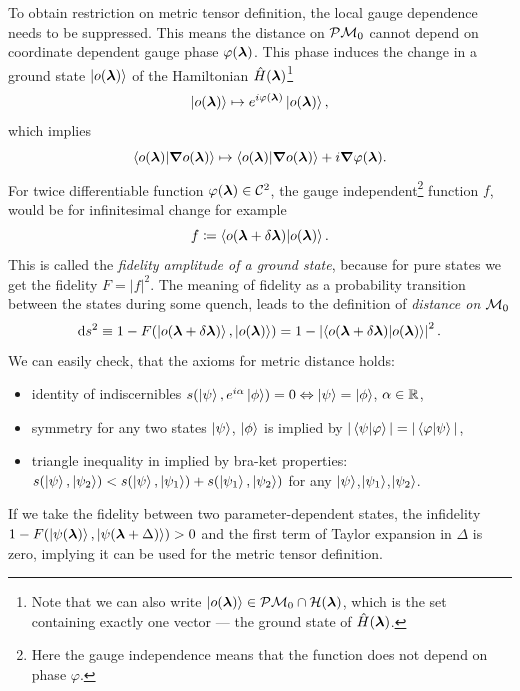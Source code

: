 To obtain restriction on metric tensor definition, the local gauge dependence needs to be suppressed. This means the distance on $\mathcal{P}\mathcal{M}_0$ cannot depend on coordinate dependent gauge phase $\varphi({\bm\lambda})$. This phase induces the change in a ground state $\ket{o({\bm\lambda})}$ of the Hamiltonian $\hat{H}({\bm\lambda})$\footnote{Note that we can also write $\ket{o({\bm\lambda})}\in \mathcal{P}\mathcal{M}_0\cap \mathcal{H}({\bm\lambda})$, which is the set containing exactly one vector — the ground state of $\hat{H}({\bm\lambda})$.}
\begin{equation}
    \ket{o({\bm\lambda})}\mapsto e^{i\varphi({\bm\lambda})} \ket{o({\bm\lambda})},
\end{equation}
which implies
\begin{equation}
        \braket{o({\bm\lambda})|\bm \nabla o({\bm\lambda})}\mapsto \braket{o({\bm\lambda})|\bm \nabla o({\bm\lambda})} + i\bm \nabla \varphi({\bm\lambda}).
\end{equation} 
For twice differentiable function $\varphi({\bm\lambda})\in \mathcal C^2$, the gauge independent\footnote{Here the gauge independence means that the function does not depend on phase $\varphi$.} function $f$, would be for infinitesimal change for example
\begin{equation}
    f\coloneqq \braket{o(\bm{{\bm\lambda}}+\delta\bm{{\bm\lambda}})|o(\bm{{\bm\lambda}})}.
    \label{eq:fidelityDefinition}
\end{equation}
This is called the \emph{fidelity amplitude of a ground state}, because for pure states we get the fidelity $F=|f|^2$. The meaning of fidelity as a probability transition between the states during some quench, leads to the definition of \emph{distance on $\mathcal{M}_0$}
\begin{equation}
    \mathrm{d} s^2 \equiv 1-F(\ket{o(\bm{{\bm\lambda}}+\delta\bm{{\bm\lambda}})},\ket{o({\bm\lambda})})= 1-\left|\braket{o(\bm{{\bm\lambda}}+\delta\bm{{\bm\lambda}})|o(\bm{{\bm\lambda}})}\right|^2.
    \label{eq:distanceOnM0}
\end{equation}
We can easily check, that the axioms for metric distance holds:
\begin{itemize}
    \item identity of indiscernibles $s(\ket{\psi},e^{i\alpha}\ket{\phi}) = 0 \Leftrightarrow \ket{\psi}=\ket{\phi}$, $\alpha\in\mathbb{R}$,
    \item symmetry for any two states $\ket{\psi}$, $\ket{\phi}$ is implied by $|\braket{\psi|\varphi}|=|\braket{\varphi|\psi}|$,
    \item triangle inequality in implied by bra-ket properties: \\
    $s(\ket{\psi},\ket{\psi_2}) <s(\ket{\psi},\ket{\psi_1}) + s(\ket{\psi_1},\ket{\psi_2})$ for any $\ket{\psi}$,$\ket{\psi_1}$,$\ket{\psi_2}$.
\end{itemize}
If we take the fidelity between two parameter-dependent states, the infidelity $1-F(\ket{\psi({\bm\lambda})},\ket{\psi({\bm\lambda}+\Delta)})>0$ and the first term of Taylor expansion in $\Delta$ is zero, implying it can be used for the metric tensor definition.

